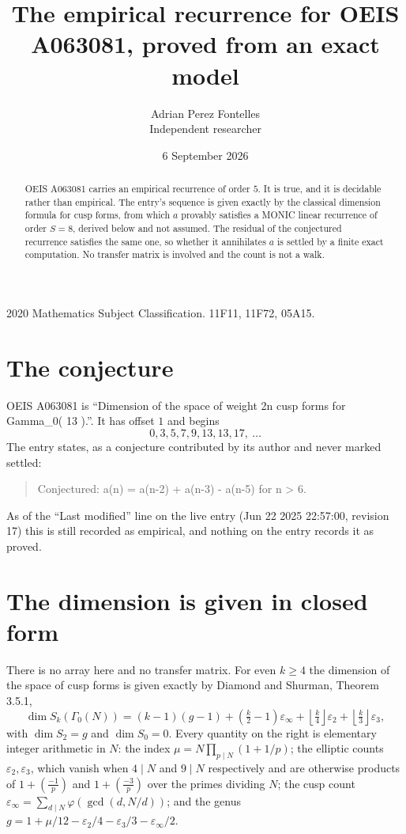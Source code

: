 \documentclass[11pt,a4paper]{article}
\title{The empirical recurrence for OEIS A063081, proved from an exact model}
\author{Adrian Perez Fontelles\\ \small Independent researcher}
\date{6 September 2026}
\theoremstyle{plain}
\theoremstyle{definition}
\begin{document}
\maketitle

\begin{abstract}
OEIS A063081 carries an empirical recurrence of order $5$. It is true, and it is
decidable rather than empirical. The entry's sequence is given exactly by the classical dimension formula for cusp forms, from
which $a$ provably satisfies a MONIC linear recurrence of order $S=8$, derived below and not
assumed. The residual of the conjectured recurrence satisfies the same one, so whether it
annihilates $a$ is settled by a finite exact computation. No transfer matrix is involved and
the count is not a walk.
\end{abstract}

\noindent\small 2020 Mathematics Subject Classification. 11F11, 11F72, 05A15.\normalsize

\section{The conjecture}

OEIS A063081 is ``Dimension of the space of weight 2n cusp forms for Gamma\_0( 13 ).''. It has offset $1$ and begins
\[
0, 3, 5, 7, 9, 13, 13, 17,\ \dots
\]
The entry states, as a conjecture contributed by its author and never marked settled:
\begin{quote}
Conjectured: a(n) = a(n-2) + a(n-3) - a(n-5) for n > 6.
\end{quote}
As of the ``Last modified'' line on the live entry (Jun 22 2025 22:57:00, revision 17)
this is still recorded as empirical, and nothing on the entry records it as proved.

\section{The dimension is given in closed form}

There is no array here and no transfer matrix. For even $k\ge4$ the dimension of the space of
cusp forms is given exactly by Diamond and Shurman, Theorem 3.5.1,
\[
\dim S_k(\Gamma_0(N))=(k-1)(g-1)+\left(\tfrac{k}{2}-1\right)\varepsilon_\infty
+\left\lfloor\tfrac{k}{4}\right\rfloor\varepsilon_2
+\left\lfloor\tfrac{k}{3}\right\rfloor\varepsilon_3 ,
\]
with $\dim S_2=g$ and $\dim S_0=0$. Every quantity on the right is elementary integer
arithmetic in $N$: the index $\mu=N\prod_{p\mid N}(1+1/p)$; the elliptic counts
$\varepsilon_2,\varepsilon_3$, which vanish when $4\mid N$ and $9\mid N$ respectively and are
otherwise products of $1+\left(\frac{-1}{p}\right)$ and $1+\left(\frac{-3}{p}\right)$
over the primes dividing $N$; the cusp count
$\varepsilon_\infty=\sum_{d\mid N}\varphi(\gcd(d,N/d))$; and the genus
$g=1+\mu/12-\varepsilon_2/4-\varepsilon_3/3-\varepsilon_\infty/2$.
\end{document}
